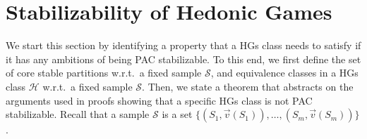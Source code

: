 \documentclass[letterpaper]{article} %
\newtheorem{definition}[theorem]{Definition}
\newcommand{\set}[1]{\{#1\}}
\newcommand{\hclass}{\ensuremath{\mathcal{H}}}
\newcommand{\sample}{\ensuremath{\mathcal{S}}}
\begin{document}
\section{Stabilizability of Hedonic Games}\label{sec:stabilizability}
We start this section by identifying a property that a HGs class needs to satisfy if it has any ambitions of being PAC stabilizable. To this end, we first define the set of core stable partitions w.r.t.\ a fixed sample $\sample$, and equivalence classes in a HGs class $\hclass$ w.r.t.\ a fixed sample $\sample$. Then, we state a theorem that abstracts on the arguments used in proofs showing that a specific HGs class is not PAC stabilizable. Recall that a sample $\sample$ is a set $\{( S_1, \vec{v}({S_1})), \ldots, ( S_m, \vec{v}({S_m}))\}$.

\end{document}
